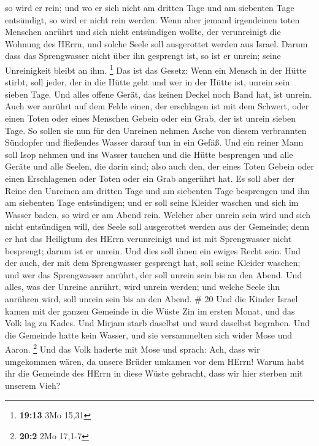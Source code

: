 so wird er rein; und wo er sich nicht am dritten Tage und am siebenten
Tage entsündigt, so wird er nicht rein werden.  Wenn aber
jemand irgendeinen toten Menschen anrührt und sich nicht entsündigen
wollte, der verunreinigt die Wohnung des HErrn, und solche Seele soll
ausgerottet werden aus Israel. Darum dass das Sprengwasser nicht über
ihn gesprengt ist, so ist er unrein; seine Unreinigkeit bleibt an ihm.
\footnote{\textbf{19:13} 3Mo 15,31}  Das ist das Gesetz:
Wenn ein Mensch in der Hütte stirbt, soll jeder, der in die Hütte geht
und wer in der Hütte ist, unrein sein sieben Tage.  Und
alles offene Gerät, das keinen Deckel noch Band hat, ist unrein.
 Auch wer anrührt auf dem Felde einen, der erschlagen ist
mit dem Schwert, oder einen Toten oder eines Menschen Gebein oder ein
Grab, der ist unrein sieben Tage.  So sollen sie nun für
den Unreinen nehmen Asche von diesem verbrannten Sündopfer und
fließendes Wasser darauf tun in ein Gefäß.  Und ein reiner
Mann soll Isop nehmen und ins Wasser tauchen und die Hütte besprengen
und alle Geräte und alle Seelen, die darin sind; also auch den, der
eines Toten Gebein oder einen Erschlagenen oder Toten oder ein Grab
angerührt hat.  Es soll aber der Reine den Unreinen am
dritten Tage und am siebenten Tage besprengen und ihn am siebenten Tage
entsündigen; und er soll seine Kleider waschen und sich im Wasser baden,
so wird er am Abend rein.  Welcher aber unrein sein wird
und sich nicht entsündigen will, des Seele soll ausgerottet werden aus
der Gemeinde; denn er hat das Heiligtum des HErrn verunreinigt und ist
mit Sprengwasser nicht besprengt; darum ist er unrein.  Und
dies soll ihnen ein ewiges Recht sein. Und der auch, der mit dem
Sprengwasser gesprengt hat, soll seine Kleider waschen; und wer das
Sprengwasser anrührt, der soll unrein sein bis an den Abend.
 Und alles, was der Unreine anrührt, wird unrein werden;
und welche Seele ihn anrühren wird, soll unrein sein bis an den Abend.
\# 20  Und die Kinder Israel kamen mit der ganzen Gemeinde
in die Wüste Zin im ersten Monat, und das Volk lag zu Kades. Und Mirjam
starb daselbst und ward daselbst begraben.  Und die Gemeinde
hatte kein Wasser, und sie versammelten sich wider Mose und Aaron.
\footnote{\textbf{20:2} 2Mo 17,1-7}  Und das Volk haderte
mit Mose und sprach: Ach, dass wir umgekommen wären, da unsere Brüder
umkamen vor dem HErrn!  Warum habt ihr die Gemeinde des
HErrn in diese Wüste gebracht, dass wir hier sterben mit unserem Vieh?
